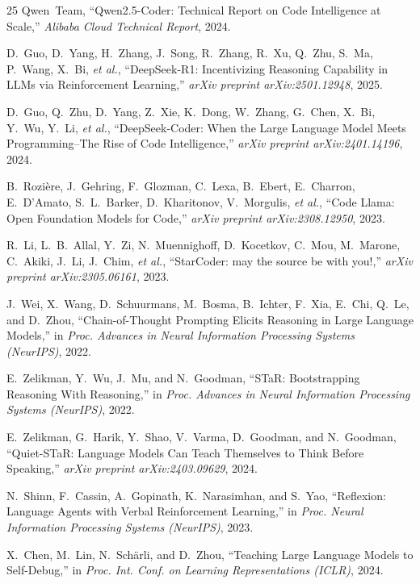 \documentclass{ieeeaccess}
\begin{document}
\begin{thebibliography}{25}
Qwen~Team,
``Qwen2.5-Coder: Technical Report on Code Intelligence at Scale,''
\textit{Alibaba Cloud Technical Report}, 2024.

D.~Guo, D.~Yang, H.~Zhang, J.~Song, R.~Zhang, R.~Xu, Q.~Zhu, S.~Ma, P.~Wang, X.~Bi, \textit{et al.},
``DeepSeek-R1: Incentivizing Reasoning Capability in LLMs via Reinforcement Learning,''
\textit{arXiv preprint arXiv:2501.12948}, 2025.

D.~Guo, Q.~Zhu, D.~Yang, Z.~Xie, K.~Dong, W.~Zhang, G.~Chen, X.~Bi, Y.~Wu, Y.~Li, \textit{et al.},
``DeepSeek-Coder: When the Large Language Model Meets Programming--The Rise of Code Intelligence,''
\textit{arXiv preprint arXiv:2401.14196}, 2024.

B.~Rozi{\`e}re, J.~Gehring, F.~Glozman, C.~Lexa, B.~Ebert, E.~Charron, E.~D'Amato, S.~L.~Barker, D.~Kharitonov, V.~Morgulis, \textit{et al.},
``Code Llama: Open Foundation Models for Code,''
\textit{arXiv preprint arXiv:2308.12950}, 2023.

R.~Li, L.~B.~Allal, Y.~Zi, N.~Muennighoff, D.~Kocetkov, C.~Mou, M.~Marone, C.~Akiki, J.~Li, J.~Chim, \textit{et al.},
``StarCoder: may the source be with you!,''
\textit{arXiv preprint arXiv:2305.06161}, 2023.

J.~Wei, X.~Wang, D.~Schuurmans, M.~Bosma, B.~Ichter, F.~Xia, E.~Chi, Q.~Le, and D.~Zhou,
``Chain-of-Thought Prompting Elicits Reasoning in Large Language Models,''
in \textit{Proc. Advances in Neural Information Processing Systems (NeurIPS)}, 2022.

E.~Zelikman, Y.~Wu, J.~Mu, and N.~Goodman,
``STaR: Bootstrapping Reasoning With Reasoning,''
in \textit{Proc. Advances in Neural Information Processing Systems (NeurIPS)}, 2022.

E.~Zelikman, G.~Harik, Y.~Shao, V.~Varma, D.~Goodman, and N.~Goodman,
``Quiet-STaR: Language Models Can Teach Themselves to Think Before Speaking,''
\textit{arXiv preprint arXiv:2403.09629}, 2024.

N.~Shinn, F.~Cassin, A.~Gopinath, K.~Narasimhan, and S.~Yao,
``Reflexion: Language Agents with Verbal Reinforcement Learning,''
in \textit{Proc. Neural Information Processing Systems (NeurIPS)}, 2023.

X.~Chen, M.~Lin, N.~Sch{\"a}rli, and D.~Zhou,
``Teaching Large Language Models to Self-Debug,''
in \textit{Proc. Int. Conf. on Learning Representations (ICLR)}, 2024.


\end{thebibliography}
\end{document}
